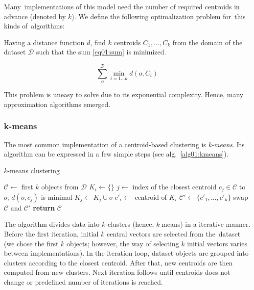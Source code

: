 Many~implementations of this model need the number of required centroids in advance (denoted by $k$). We define the following optimalization problem for~this kinds of~algorithms: 

\begin{problem}
	Having a distance function $d$, find $k$ centroids $C_1,\dots,C_k$ from the domain of the dataset $\mathcal{D}$ such that the sum \ref{eq01:sum}
	is minimized.
\end{problem}

\begin{equation}\label{eq01:sum}
	\sum_o^{\mathcal{D}} \min_{i=1\dots k}d(o,C_i)
\end{equation}

This problem is uneasy to solve due to its exponential complexity. Hence, many approximation algorithms emerged. 

\subsubsection{k-means}

The most common implementation of a centroid-based clustering is \emph{k-means}. Its algorithm can be expressed in a few simple steps (see alg.~\ref{alg01:kmeans}).

\begin{algorithm}
	\caption{$k$-means clustering}
	\label{alg01:kmeans}
	\begin{algorithmic}[1]
		\State $\mathcal{C} \gets$ first $k$ objects from  $\mathcal{D}$ 
		\Repeat
				\State $K_i \gets \{\}$
			\EndFor
				\State $j \gets$ index of the closest centroid $c_j \in \mathcal{C}$ to $o$; $d(o,c_j)$ is minimal
				\State $K_{j} \gets K_{j} \cup o$ 
			\EndFor
				\State $c'_i \gets$ centroid of $K_i$ 
			\EndFor
			\State $\mathcal{C}' \gets \{c'_1,\dots,c'_k\}$
			\State swap $\mathcal{C}$ and $\mathcal{C}'$
		\State \textbf{return} $\mathcal{C}$
		\EndProcedure
	\end{algorithmic}
\end{algorithm}


The algorithm divides data into $k$ clusters (hence, \emph{k}-means) in a iterative manner. Before the first iteration, initial $k$ central vectors are selected from the~dataset (we chose the first $k$ objects; however, the way of selecting $k$ initial vectors varies between 
implementations). In the iteration loop, dataset objects are grouped into clusters according to the closest centroid. After that, new centroids are then computed from new clusters. Next iteration follows until centroids does not change or predefined number of iterations is reached. 

